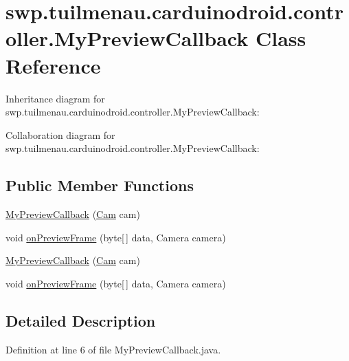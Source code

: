 \hypertarget{classswp_1_1tuilmenau_1_1carduinodroid_1_1controller_1_1_my_preview_callback}{}\section{swp.\+tuilmenau.\+carduinodroid.\+controller.\+My\+Preview\+Callback Class Reference}
\label{classswp_1_1tuilmenau_1_1carduinodroid_1_1controller_1_1_my_preview_callback}


Inheritance diagram for swp.\+tuilmenau.\+carduinodroid.\+controller.\+My\+Preview\+Callback\+:


Collaboration diagram for swp.\+tuilmenau.\+carduinodroid.\+controller.\+My\+Preview\+Callback\+:
\subsection*{Public Member Functions}
\begin{DoxyCompactItemize}
\item 
\hyperlink{classswp_1_1tuilmenau_1_1carduinodroid_1_1controller_1_1_my_preview_callback_a7449892b8d437f14fad2694c21014b94}{My\+Preview\+Callback} (\hyperlink{classswp_1_1tuilmenau_1_1carduinodroid_1_1controller_1_1_cam}{Cam} cam)
\item 
void \hyperlink{classswp_1_1tuilmenau_1_1carduinodroid_1_1controller_1_1_my_preview_callback_a74b7673db7b371599752a8c541348852}{on\+Preview\+Frame} (byte\mbox{[}$\,$\mbox{]} data, Camera camera)
\item 
\hyperlink{classswp_1_1tuilmenau_1_1carduinodroid_1_1controller_1_1_my_preview_callback_a7449892b8d437f14fad2694c21014b94}{My\+Preview\+Callback} (\hyperlink{classswp_1_1tuilmenau_1_1carduinodroid_1_1controller_1_1_cam}{Cam} cam)
\item 
void \hyperlink{classswp_1_1tuilmenau_1_1carduinodroid_1_1controller_1_1_my_preview_callback_a74b7673db7b371599752a8c541348852}{on\+Preview\+Frame} (byte\mbox{[}$\,$\mbox{]} data, Camera camera)
\end{DoxyCompactItemize}


\subsection{Detailed Description}


Definition at line 6 of file My\+Preview\+Callback.\+java.



